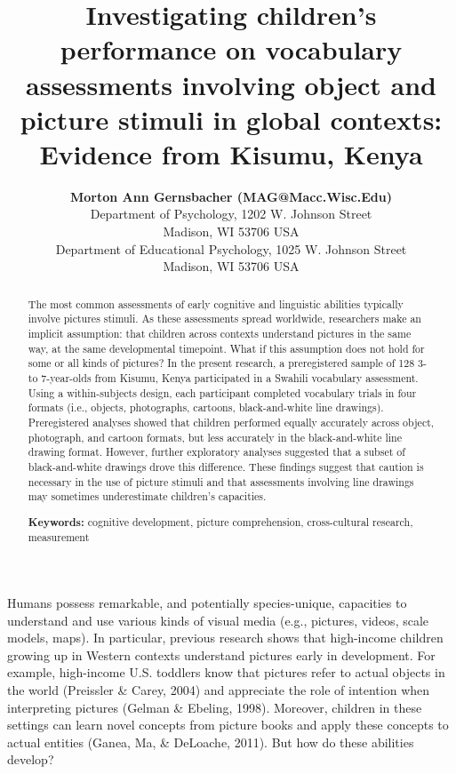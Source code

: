 \documentclass[10pt, letterpaper]{article}
\title{Investigating children's performance on vocabulary assessments
involving object and picture stimuli in global contexts: Evidence from
Kisumu, Kenya}
\author{{\large \bf Morton Ann Gernsbacher (MAG@Macc.Wisc.Edu)} \\ Department of Psychology, 1202 W. Johnson Street \\ Madison, WI 53706 USA \AND {\large \bf Sharon J.~Derry (SDJ@Macc.Wisc.Edu)} \\ Department of Educational Psychology, 1025 W. Johnson Street \\ Madison, WI 53706 USA}
\begin{document}
\maketitle

\begin{abstract}
The most common assessments of early cognitive and linguistic abilities
typically involve pictures stimuli. As these assessments spread
worldwide, researchers make an implicit assumption: that children across
contexts understand pictures in the same way, at the same developmental
timepoint. What if this assumption does not hold for some or all kinds
of pictures? In the present research, a preregistered sample of 128 3-
to 7-year-olds from Kisumu, Kenya participated in a Swahili vocabulary
assessment. Using a within-subjects design, each participant completed
vocabulary trials in four formats (i.e., objects, photographs, cartoons,
black-and-white line drawings). Preregistered analyses showed that
children performed equally accurately across object, photograph, and
cartoon formats, but less accurately in the black-and-white line drawing
format. However, further exploratory analyses suggested that a subset of
black-and-white drawings drove this difference. These findings suggest
that caution is necessary in the use of picture stimuli and that
assessments involving line drawings may sometimes underestimate
children's capacities.

\textbf{Keywords:}
cognitive development, picture comprehension, cross-cultural research,
measurement
\end{abstract}

Humans possess remarkable, and potentially species-unique, capacities to
understand and use various kinds of visual media (e.g., pictures,
videos, scale models, maps). In particular, previous research shows that
high-income children growing up in Western contexts understand pictures
early in development. For example, high-income U.S. toddlers know that
pictures refer to actual objects in the world (Preissler \& Carey, 2004)
and appreciate the role of intention when interpreting pictures (Gelman
\& Ebeling, 1998). Moreover, children in these settings can learn novel
concepts from picture books and apply these concepts to actual entities
(Ganea, Ma, \& DeLoache, 2011). But how do these abilities develop?
\end{document}
